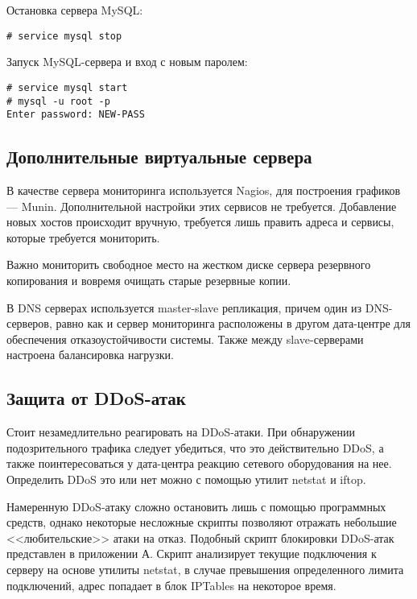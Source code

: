 Остановка сервера MySQL:
\begin{lstlisting}
# service mysql stop
\end{lstlisting}

Запуск MySQL-сервера и вход с новым паролем:
\begin{lstlisting}
# service mysql start
# mysql -u root -p
Enter password: NEW-PASS
\end{lstlisting}

\subsection{Дополнительные виртуальные сервера}

В качестве сервера мониторинга используется Nagios, для построения графиков --- Munin.
Дополнительной настройки этих сервисов не требуется.
Добавление новых хостов происходит вручную, требуется лишь править адреса и сервисы, которые требуется мониторить.

Важно мониторить свободное место на жестком диске сервера резервного копирования и вовремя очищать старые резервные копии.

В DNS серверах используется master-slave репликация, причем один из DNS-серверов, равно как и сервер мониторинга расположены в другом дата-центре для обеспечения отказоустойчивости системы.
Также между slave-серверами настроена балансировка нагрузки.

\subsection{Защита от DDoS-атак}

Стоит незамедлительно реагировать на DDoS-атаки.
При обнаружении подозрительного трафика следует убедиться, что это действительно DDoS, а также поинтересоваться у дата-центра реакцию сетевого оборудования на нее.
Определить DDoS это или нет можно с помощью утилит netstat и iftop.

Намеренную DDoS-атаку сложно остановить лишь с помощью программных средств, однако некоторые несложные скрипты позволяют отражать небольшие <<любительские>> атаки на отказ.
Подобный скрипт блокировки DDoS-атак представлен в приложении А.
Скрипт анализирует текущие подключения к серверу на основе утилиты netstat, в случае превышения определенного лимита подключений, адрес попадает в блок IPTables на некоторое время.

